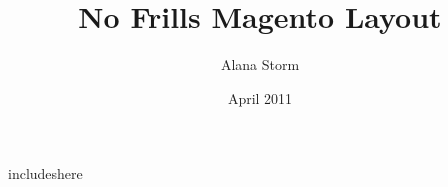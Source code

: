 \documentclass[oneside]{book}
\begin{document}
\title{No Frills Magento Layout}
\author{Alana Storm}
\date{April 2011}

\maketitle
\tableofcontents
\setcounter{chapter}{-1}

includeshere

%
%
\end{document}
